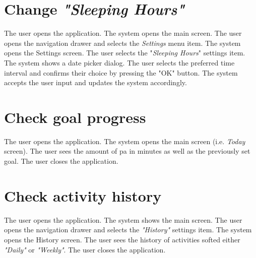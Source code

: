 \section*{Change \textit{"Sleeping Hours"}}
    The user opens the application. The system opens the main screen. The user opens the navigation drawer and selects the \textit{Settings} menu item. The system opens the Settings screen. The user selects the "\textit{Sleeping Hours}" settings item. The system shows a date picker dialog. The user selects the preferred time interval and confirms their choice by pressing the "OK" button. The system accepts the user input and updates the system accordingly.
    
\section*{Check goal progress}
    The user opens the application. The system opens the main screen (i.e. \textit{Today} screen). The user sees the amount of \gls{pa} in minutes as well as the previously set goal. The user closes the application.
    
\section*{Check activity history}
    The user opens the application. The system shows the main screen. The user opens the navigation drawer and selects the \textit{"History"} settings item. The system opens the History screen. The user sees the history of activities softed either \textit{"Daily"} or \textit{"Weekly"}. The user closes the application. 
